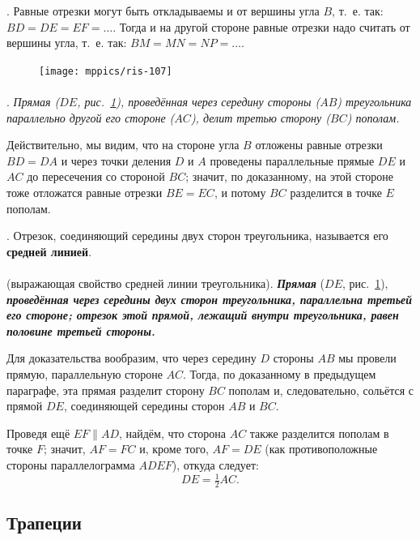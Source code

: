 \documentclass[oneside]{book}
\begin{document}
.
Равные отрезки могут быть откладываемы и от вершины угла $B$, т.~е.
так:
$BD=DE= EF=\dots$.
Тогда и на другой стороне равные отрезки надо считать от вершины угла, т.~е. так:
$BM=MN=NP=\dots$.

\begin{figure}
\vskip-9mm
\centering
\texttt{[image: mppics/ris-107]}
\caption{}\label{1938/ris-107}
\end{figure}

\paragraph{}\label{1938/96}
\mbox{.}
\emph{Прямая \emph{($DE$, рис.~\ref{1938/ris-107}),} проведённая через середину стороны ($AB$) треугольника параллельно другой его стороне ($AC$), делит третью сторону ($BC$) пополам.}

Действительно, мы видим, что на стороне угла $B$ отложены равные отрезки $BD=DA$ и через точки деления $D$ и $A$ проведены параллельные прямые $DE$ и $AC$ до пересечения со стороной $BC$;
значит, по доказанному, на этой стороне тоже отложатся равные отрезки $BE=EC$, и потому $BC$ разделится в точке $E$ пополам.

\mbox{.}
Отрезок, соединяющий середины двух сторон треугольника, называется его \textbf{средней линией}.

\paragraph{}\label{1938/97}
 (выражающая свойство средней линии треугольника).
\textbf{\emph{Прямая}} ($DE$, рис.~\ref{1938/ris-107}), \textbf{\emph{проведённая через середины двух сторон треугольника, параллельна третьей его стороне;
отрезок этой прямой, лежащий внутри треугольника, равен половине третьей стороны.}}

Для доказательства вообразим, что через середину $D$ стороны $AB$ мы провели прямую, параллельную стороне $AC$.
Тогда, по доказанному в предыдущем параграфе, эта прямая разделит сторону $BC$ пополам и, следовательно, сольётся с прямой $DE$, соединяющей середины сторон $AB$ и $BC$.

Проведя ещё $EF \parallel AD$, найдём, что сторона $AC$ также разделится пополам в точке $F$;
значит, $AF=FC$ и, кроме того, $AF=DE$
(как противоположные стороны параллелограмма $ADEF$), откуда следует:
\[DE=\tfrac12AC.\]

\subsection*{Трапеции}
\end{document}

